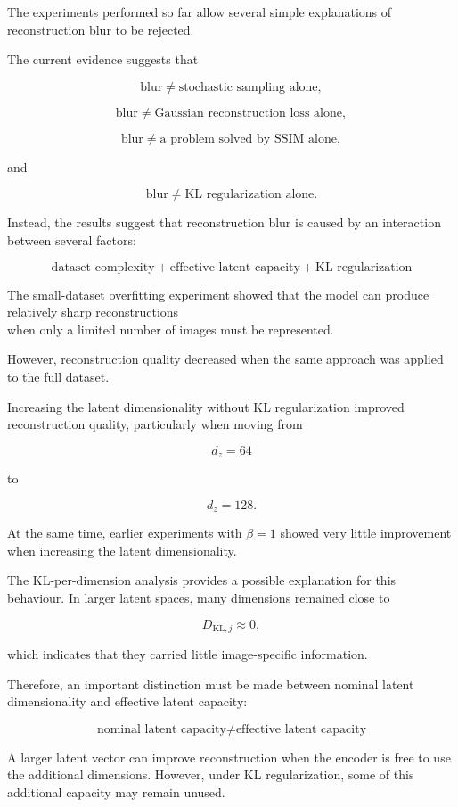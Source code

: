 \documentclass[a4paper,11pt]{article}
\begin{document}
The experiments performed so far allow several simple explanations of reconstruction blur to be rejected.

The current evidence suggests that

\[
\text{blur}
\neq
\text{stochastic sampling alone},
\]

\[
\text{blur}
\neq
\text{Gaussian reconstruction loss alone},
\]

\[
\text{blur}
\neq
\text{a problem solved by SSIM alone},
\]

and

\[
\text{blur}
\neq
\text{KL regularization alone}.
\]

Instead, the results suggest that reconstruction blur is caused by an interaction between several factors:

\[
\boxed{
\text{dataset complexity}
+
\text{effective latent capacity}
+
\text{KL regularization}
}
\]

The small-dataset overfitting experiment showed that the model can produce relatively sharp reconstructions\\
when only a limited number of images must be represented.

However, reconstruction quality decreased when the same approach was applied to the full dataset.

Increasing the latent dimensionality without KL regularization improved reconstruction quality, particularly when moving from

\[
d_z = 64
\]

to

\[
d_z = 128.
\]

At the same time, earlier experiments with $\beta=1$ showed very little improvement when increasing the latent dimensionality.

The KL-per-dimension analysis provides a possible explanation for this behaviour. In larger latent spaces, many dimensions remained close to

\[
D_{\mathrm{KL},j} \approx 0,
\]

which indicates that they carried little image-specific information.

Therefore, an important distinction must be made between nominal latent dimensionality and effective latent capacity:

\[
\boxed{
\text{nominal latent capacity}
\neq
\text{effective latent capacity}
}
\]

A larger latent vector can improve reconstruction when the encoder is free to use the additional dimensions. However, under KL regularization, some of this additional capacity may remain unused.
\end{document}
